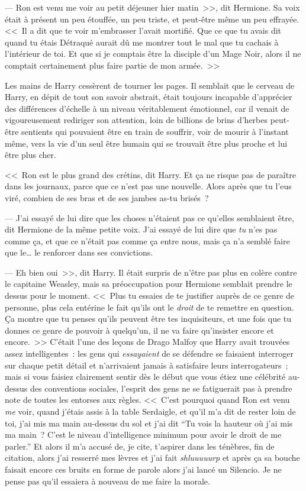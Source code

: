 --- Ron est venu me voir au petit déjeuner hier matin~>>, dit Hermione. Sa voix était à présent un peu étouffée, un peu triste, et peut-être même un peu effrayée. <<~Il a dit que te voir m'embrasser l'avait mortifié. Que ce que tu avais dit quand tu étais Détraqué aurait dû me montrer tout le mal que tu cachais à l'intérieur de toi. Et que si je comptais être la disciple d'un Mage Noir, alors il ne comptait certainement plus faire partie de mon armée.~>>

Les mains de Harry cessèrent de tourner les pages. Il semblait que le cerveau de Harry, en dépit de tout son savoir abstrait, était toujours incapable d'apprécier des différences d'échelle à un niveau véritablement émotionnel, car il venait de vigoureusement rediriger son attention, loin de billions de brins d'herbes peut-être sentients qui pouvaient être en train de souffrir, voir de mourir à l'instant même, vers la vie d'un seul être humain qui se trouvait être plus proche et lui être plus cher.

<<~Ron est le plus grand des crétins, dit Harry. Et ça ne risque pas de paraître dans les journaux, parce que ce n'est pas une nouvelle. Alors après que tu l'eus viré, combien de ses bras et de ses jambes as-tu brisés~?

--- J'ai essayé de lui dire que les choses n'étaient pas ce qu'elles semblaient être, dit Hermione de la même petite voix. J'ai essayé de lui dire que \emph{tu} n'es pas comme ça, et que ce n'était pas comme ça entre nous, mais ça n'a semblé faire que le… le renforcer dans ses convictions.

--- Eh bien oui~>>, dit Harry. Il était surpris de n'être pas plus en colère contre le capitaine Weasley, mais sa préoccupation pour Hermione semblait prendre le dessus pour le moment. <<~Plus tu essaies de te justifier auprès de ce genre de personne, plus cela entérine le fait qu'ils ont le \emph{droit} de te remettre en question. Ça montre que tu penses qu'ils peuvent être tes inquisiteurs, et une fois que tu donnes ce genre de pouvoir à quelqu'un, il ne va faire qu'insister encore et encore.~>> C'était l'une des leçons de Drago Malfoy que Harry avait trouvées assez intelligentes~: les gens qui \emph{essayaient} de se défendre se faisaient interroger sur chaque petit détail et n'arrivaient jamais à satisfaire leurs interrogateurs~; mais si vous faisiez clairement sentir dès le début que vous étiez une célébrité au-dessus des conventions sociales, l'esprit des gens ne se fatiguerait pas à prendre note de toutes les entorses aux règles. <<~C'est pourquoi quand Ron est venu \emph{me} voir, quand j'étais assis à la table Serdaigle, et qu'il m'a dit de rester loin de toi, j'ai mis ma main au-dessus du sol et j'ai dit “Tu vois la hauteur où j'ai mis ma main~? C'est le niveau d'intelligence minimum pour avoir le droit de me parler.” Et alors il m'a accusé de, je cite, t'aspirer dans les ténèbres, fin de citation, alors j'ai resserré mes lèvres et j'ai fait \emph{shluuuuurp} et après ça sa bouche faisait encore ces bruits en forme de parole alors j'ai lancé un Silencio. Je ne pense pas qu'il essaiera à nouveau de me faire la morale.

